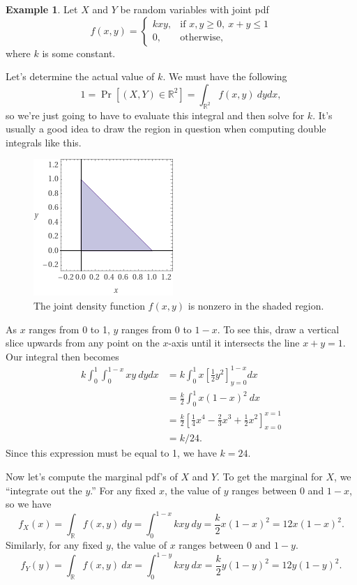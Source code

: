 \documentclass[12pt]{article}
\theoremstyle{plain}
\theoremstyle{definition}
\newtheorem{example}[theorem]{Example}
\theoremstyle{remark}
\newcommand{\R}{\mathbb{R}}
\begin{document}
\begin{example}\label{triangle density}
    Let $X$ and $Y$ be random variables with joint pdf
    \[
        f(x,y) = \begin{cases}
            kxy,&\text{if }x,y\geq 0,\ x+y \leq 1\\
            0,&\text{otherwise,}
        \end{cases}
    \]
    where $k$ is some constant.

    Let's determine the actual value of $k$.
    We must have the following
    \[
        1 = \Pr[(X,Y) \in \R^2] = \int_{\R^2}f(x, y)\ dydx,
    \]
    so we're just going to have to evaluate this integral and then solve for $k$.
    It's usually a good idea to draw the region in question when computing double integrals like this.
    \begin{figure}[h]
    \centering        
        \includegraphics[scale=1]{1-1region.png}
        \caption{The joint density function $f(x,y)$ is nonzero in the shaded region.}
    \end{figure}
    As $x$ ranges from 0 to 1, $y$ ranges from 0 to $1-x$.
    To see this, draw a vertical slice upwards from any point on the $x$-axis until it intersects the line $x+y=1$.
    Our integral then becomes
    \begin{align*}
        k\int_0^1\int_0^{1-x}xy\ dydx &= k\int_0^1x\left[\frac{1}{2}y^2\right]_{y=0}^{1-x}dx\\
        &= \frac{k}{2}\int_0^1x(1-x)^2\ dx\\
        &= \frac{k}{2}\left[\frac{1}{4}x^4-\frac{2}{3}x^3 + \frac{1}{2}x^2\right]_{x=0}^{x=1}\\
        &= k/24.
    \end{align*}
    Since this expression must be equal to 1, we have $k=24$.

    Now let's compute the marginal pdf's of $X$ and $Y$.
    To get the marginal for $X$, we ``integrate out the $y$.''
    For any fixed $x$, the value of $y$ ranges between 0 and $1-x$, so we have
    \[
        f_X(x) = \int_{\R}f(x,y)\ dy = \int_0^{1-x}kxy\ dy = \frac{k}{2}x(1-x)^2 = 12x(1-x)^2.
    \]
    Similarly, for any fixed $y$, the value of $x$ ranges between 0 and $1-y$.
    \[
        f_Y(y) = \int_{\R}f(x,y)\ dx = \int_0^{1-y}kxy\ dx = \frac{k}{2}y(1-y)^2 = 12y(1-y)^2.
    \]
\end{example}
\end{document}
